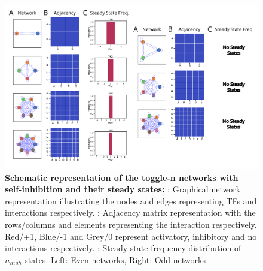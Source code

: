 \documentclass[11pt,a4paper]{article}
\theoremstyle{definition}
\theoremstyle{remark}
\begin{document}
\begin{figure}[h]
    \begin{subfigure}[c]{\textwidth}
        \label{graph-si}
    \end{subfigure}
    \begin{subfigure}[c]{\textwidth}
        \label{adjmat-si}
    \end{subfigure}
    \begin{subfigure}[c]{\textwidth}
        \label{ssfreq-si}
    \end{subfigure}
    \centering
    \includegraphics[width=\textwidth]{figures/FigureS2}
    \caption{\textbf{Schematic representation of the toggle-n networks with self-inhibition and their steady states:} : Graphical network representation illustrating the nodes and edges representing TFs and interactions respectively. : Adjacency matrix representation with the rows/columns and elements representing the interaction respectively. Red/+1, Blue/-1 and Grey/0 represent activatory, inhibitory and no interactions respectively. : Steady state frequency distribution of $n_{high}$ states. Left: Even networks, Right: Odd networks}
    \label{networks-si}
\end{figure}
\end{document}
